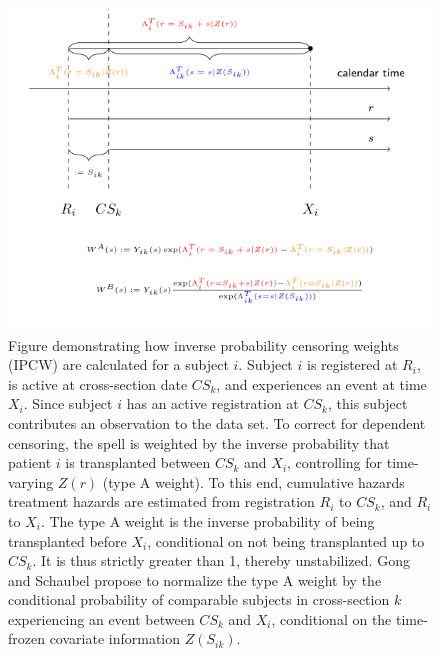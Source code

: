 \documentclass[11pt,twoside,]{book}
\begin{document}
\begin{figure}[h]

{\centering \includegraphics[width=0.95\linewidth]{figures/appendix//gong_schaubel_ipcw} 

}

\caption{Figure demonstrating how inverse probability censoring
weights (IPCW) are calculated for a subject $i$. Subject $i$ is
registered at $R_{i}$, is active at cross-section date $CS_{k}$, and
experiences an event at time $X_{i}$. Since subject $i$ has an active
registration at $CS_{k}$, this subject contributes an observation to the
data set. To correct for dependent censoring, the spell is weighted by
the inverse probability that patient $i$ is transplanted between
$CS_{k}$ and $X_{i}$, controlling for time-varying $Z( r )$
(type A weight). To this end, cumulative hazards treatment hazards are
estimated from registration $R_{i}$ to $CS_{k}$, and $R_{i}$ to $X_{i}$.
The type A weight is the inverse probability of being transplanted
before $X_{i}$, conditional on not being transplanted up to $CS_{k}$. It
is thus strictly greater than 1, thereby unstabilized. Gong and Schaubel
propose to normalize the type A weight by the conditional probability of
comparable subjects in cross-section $k$ experiencing an event between
$CS_{k}$ and $X_{i}$, conditional on the time-frozen covariate
information $Z( S_{ik} )$.}\label{fig:appfig1}
\end{figure}

\FloatBarrier
\end{document}
